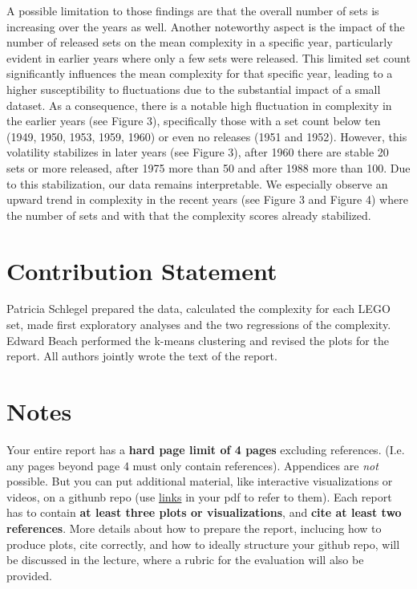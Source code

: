 \documentclass{article}
\theoremstyle{plain}
\theoremstyle{definition}
\theoremstyle{remark}
\begin{document}
A possible limitation to those findings are that the overall number of sets is increasing over the years as well. Another noteworthy aspect is the impact of the number of released sets on the mean complexity in a specific year, particularly evident in earlier years where only a few sets were released. This limited set count significantly influences the mean complexity for that specific year, leading to a higher susceptibility to fluctuations due to the substantial impact of a small dataset. As a consequence, there is a notable high fluctuation in complexity in the earlier years (see Figure 3), specifically those with a set count below ten (1949, 1950, 1953, 1959, 1960) or even no releases (1951 and 1952). However, this volatility stabilizes in later years (see Figure 3), after 1960 there are stable 20 sets or more released, after 1975 more than 50 and after 1988 more than 100. Due to this stabilization, our data remains interpretable. We especially observe an upward trend in complexity in the recent years (see Figure 3 and Figure 4) where the number of sets and with that the complexity scores already stabilized. 

\section*{Contribution Statement}

Patricia Schlegel prepared the data, calculated the complexity for each LEGO set, made first exploratory analyses and the two regressions of the complexity. Edward Beach performed the k-means clustering and revised the plots for the report. All authors jointly wrote the text of the report.

\section*{Notes} 

Your entire report has a \textbf{hard page limit of 4 pages} excluding references. (I.e. any pages beyond page 4 must only contain references). Appendices are \emph{not} possible. But you can put additional material, like interactive visualizations or videos, on a githunb repo (use \href{https://github.com/pnkraemer/tueplots}{links} in your pdf to refer to them). Each report has to contain \textbf{at least three plots or visualizations}, and \textbf{cite at least two references}. More details about how to prepare the report, inclucing how to produce plots, cite correctly, and how to ideally structure your github repo, will be discussed in the lecture, where a rubric for the evaluation will also be provided.




\end{document}
